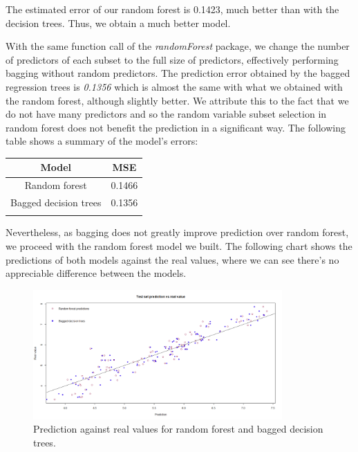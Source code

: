 \documentclass[12pt]{extarticle}
\begin{document}
The estimated error of our random forest is 0.1423, much better than with the decision trees. Thus, we obtain a much better model. 

With the same function call of the \textit{randomForest} package, we change the number of predictors of each subset to the full size of predictors, effectively performing bagging without random predictors. The prediction error obtained by the bagged regression trees is \textit{0.1356} which is almost the same with what we obtained with the random forest, although slightly better. We attribute this to the fact that we do not have many predictors and so the random variable subset selection in random forest does not benefit the prediction in a significant way. The following table shows a summary of the model’s errors:

\begin{longtable}[c]{cl}
    \rowcolor[HTML]{C0C0C0} 
    \textbf{Model} & \multicolumn{1}{c}{\cellcolor[HTML]{C0C0C0}\textbf{MSE}} \\\hline \endhead
             Random forest & 0.1466 \\\hline
             Bagged decision trees & 0.1356 \\\hline
    \label{variables}
\end{longtable}

Nevertheless, as bagging does not greatly improve prediction over random forest, we proceed with the random forest model we built. The following chart shows the predictions of both models against the real values, where we can see there’s no appreciable difference between the models.

\begin{figure}[H]
  \centering
    \includegraphics[width=0.85\textwidth]{figures/random-prediction.png}
    \caption{Prediction against real values for random forest and bagged decision trees.\label{fig:random-prediction}}
\end{figure}
\end{document}
